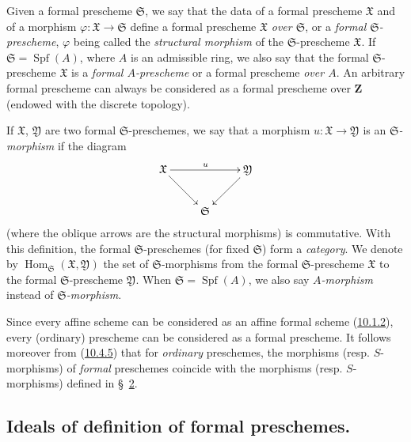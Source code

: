 \begin{env}[10.4.7]
\label{I.10.4.7}
Given a formal prescheme $\mathfrak{S}$, we say that the data of a
formal prescheme $\mathfrak{X}$ and of a morphism
$\varphi:\mathfrak{X}\to\mathfrak{S}$ define a formal prescheme
$\mathfrak{X}$ \emph{over $\mathfrak{S}$}, or a
\emph{formal $\mathfrak{S}$-prescheme}, $\varphi$ being called the
\emph{structural morphism} of the $\mathfrak{S}$-prescheme
$\mathfrak{X}$. If $\mathfrak{S}=\operatorname{Spf}(A)$, where $A$ is an
admissible ring, we also say that the formal $\mathfrak{S}$-prescheme
$\mathfrak{X}$ is a \emph{formal $A$-prescheme} or a formal prescheme
\emph{over $A$}. An arbitrary formal prescheme can always
be considered as a formal prescheme over $\mathbf{Z}$ (endowed
with the discrete topology).

If $\mathfrak{X}$, $\mathfrak{Y}$ are two formal $\mathfrak{S}$-preschemes,
we say that a morphism
$u:\mathfrak{X}\to\mathfrak{Y}$ is an
\emph{$\mathfrak{S}$-morphism} if the diagram
\[
  \xymatrix{
    \mathfrak{X}\ar[rr]^u\ar[rd] & &
    \mathfrak{Y}\ar[ld]\\
    & \mathfrak{S}
  }
\]
(where the oblique arrows are the structural morphisms) is
commutative. With this definition, the formal $\mathfrak{S}$-preschemes
(for fixed $\mathfrak{S}$) form a \emph{category}. We denote by
$\operatorname{Hom}_{\mathfrak{S}}(\mathfrak{X},\mathfrak{Y})$
the set of $\mathfrak{S}$-morphisms from the formal $\mathfrak{S}$-prescheme
$\mathfrak{X}$ to the formal $\mathfrak{S}$-prescheme
$\mathfrak{Y}$. When $\mathfrak{S}=\operatorname{Spf}(A)$, we also
say \emph{$A$-morphism} instead of
\emph{$\mathfrak{S}$-morphism}.
\end{env}

\begin{env}[10.4.8]
\label{I.10.4.8}
Since every affine scheme can be considered as an affine formal scheme
(\hyperref[I.10.1.2]{10.1.2}), every (ordinary) prescheme can be
considered as a formal prescheme. It follows moreover from
(\hyperref[I.10.4.5]{10.4.5}) that for \emph{ordinary} preschemes,
the morphisms (resp. $S$-morphisms) of \emph{formal} preschemes
coincide with the morphisms (resp. $S$-morphisms) defined in
\S~\hyperref[section:I.2]{2}.
\end{env}

\subsection{Ideals of definition of formal preschemes.}
\label{subsection:I.10.5}

